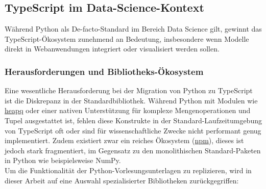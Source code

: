 \subsection{TypeScript im Data-Science-Kontext}
Während Python als De-facto-Standard im Bereich Data Science gilt, gewinnt das TypeScript-Ökosystem zunehmend an Bedeutung, insbesondere wenn Modelle direkt in Webanwendungen integriert oder visualisiert werden sollen. 

\subsubsection{Herausforderungen und Bibliotheks-Ökosystem}
Eine wesentliche Herausforderung bei der Migration von Python zu TypeScript ist die Diskrepanz in der Standardbibliothek. Während Python mit Modulen wie \href{https://docs.python.org/3/library/heapq.html}{heapq} oder einer nativen Unterstützung für komplexe Mengenoperationen und Tupel ausgestattet ist, fehlen diese Konstrukte in der Standard-Laufzeitumgebung von TypeScript oft oder sind für wissenschaftliche Zwecke nicht performant genug implementiert. Zudem existiert zwar ein reiches Ökosystem (\href{https://www.npmjs.com/}{npm}), dieses ist jedoch stark fragmentiert, im Gegensatz zu den monolithischen Standard-Paketen in Python wie beispielsweise NumPy. \\
Um die Funktionalität der Python-Vorlesungsunterlagen zu replizieren, wird in dieser Arbeit auf eine Auswahl spezialisierter Bibliotheken zurückgegriffen:

